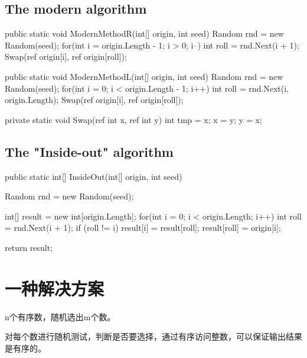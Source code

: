 \subsection{The modern algorithm}

\begin{CSharp}
        public static void ModernMethodR(int[] origin, int seed)
        {
            Random rnd = new Random(seed);
            for(int i = origin.Length - 1; i > 0; i--)
            {
                int roll = rnd.Next(i + 1);
                Swap(ref origin[i], ref origin[roll]);
            }
        }

        public static void ModernMethodL(int[] origin, int seed)
        {
            Random rnd = new Random(seed);
            for(int i = 0; i < origin.Length - 1; i++)
            {
                int roll = rnd.Next(i, origin.Length);
                Swap(ref origin[i], ref origin[roll]);
            }
        }


        private static void Swap(ref int x, ref int y)
        {
            int tmp = x;
            x = y;
            y = x;
        }
\end{CSharp}

\subsection{The "Inside-out" algorithm}

\begin{CSharp}
        public static int[] InsideOut(int[] origin, int seed)
        {
            Random rnd = new Random(seed);

            int[] result = new int[origin.Length];
            for(int i = 0; i < origin.Length; i++)
            {
                int roll = rnd.Next(i + 1);
                if (roll != i)
                {
                    result[i] = result[roll];
                }
                result[roll] = origin[i];
            }

            return result;
        }
\end{CSharp}

\section{一种解决方案}

n个有序数，随机选出m个数。

对每个数进行随机测试，判断是否要选择，通过有序访问整数，可以保证输出结果是有序的。

